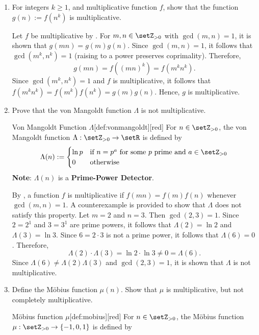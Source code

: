 \begin{enumerate}
  \item For integers $k \geq 1$, and multiplicative function $f$, show that the function $g(n):=f\left(n^{k}\right)$ is multiplicative.
  \begin{subprove}
    Let $f$ be multiplicative by . 
    For $m, n \in \setZ_{>0}$ with $\gcd(m, n) = 1$, it is shown that $g(mn) = g(m)g(n)$.
    Since $\gcd(m, n) = 1$, it follows that $\gcd(m^k, n^k) = 1$ (raising to a power preserves coprimality).
    Therefore,
    \[
    g(mn) = f((mn)^k) = f(m^k n^k).
    \]
    Since $\gcd(m^k, n^k) = 1$ and $f$ is multiplicative, it follows that $f(m^k n^k) = f(m^k) f(n^k) = g(m) g(n)$.
    Hence, $g$ is multiplicative.
  \end{subprove}
  \newpage
  \item Prove that the von Mangoldt function $\Lambda$ is not multiplicative.
  \begin{define}{Von Mangoldt Function $\Lambda$}[def:vonmangoldt][red]
    For $n\in\setZ_{>0}$, the von Mangoldt function $\Lambda:\setZ_{>0}\to\setR$ is defined by
    \[
    \Lambda(n):= \begin{cases}\ln p & \text{if } n=p^{a} \text{ for some } p \text{ prime and } a \in \setZ_{>0} \\ 0 & \text{otherwise}\end{cases}
    \]
    \textbf{Note}: $\Lambda(n)$ is a \textbf{Prime-Power Detector}.
  \end{define}
  \begin{subprove}
    By , a function $f$ is multiplicative if $f(mn) = f(m)f(n)$ whenever $\gcd(m,n) = 1$.
    A counterexample is provided to show that $\Lambda$ does not satisfy this property.
    Let $m = 2$ and $n = 3$. Then $\gcd(2,3) = 1$.
    Since $2 = 2^1$ and $3 = 3^1$ are prime powers, it follows that $\Lambda(2) = \ln 2$ and $\Lambda(3) = \ln 3$.
    Since $6 = 2 \cdot 3$ is not a prime power, it follows that $\Lambda(6) = 0$.
    Therefore,
    \[
    \Lambda(2) \cdot \Lambda(3) = \ln 2 \cdot \ln 3 \neq 0 = \Lambda(6).
    \]
    Since $\Lambda(6) \neq \Lambda(2)\Lambda(3)$ and $\gcd(2,3) = 1$, it is shown that $\Lambda$ is not multiplicative.
  \end{subprove}
  \item Define the Möbius function $\mu(n)$. Show that $\mu$ is multiplicative, but not completely multiplicative.
  \begin{define}{Möbius function $\mu$}[def:mobius][red]
    For $n\in\setZ_{>0}$, the Möbius function $\mu:\setZ_{>0}\to\{-1,0,1\}$ is defined by

\end{define}
\end{enumerate}

